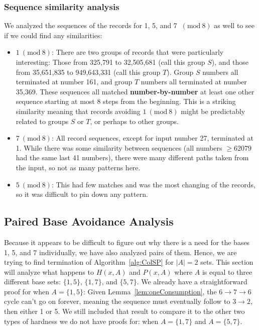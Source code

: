 \documentclass[12pt]{article}
\newcommand{\Mod}[1]{\ (\mathrm{mod}\ #1)}
\theoremstyle{definition}
\begin{document}
\subsubsection{Sequence similarity analysis} \label{subsubsec:algseqsim}
We analyzed the sequences of the records for 1, 5, and 7 $\Mod{8}$ as well to see if we could find any similarities:
\begin{itemize}
    \item $1\Mod{8}$: There are two groups of records that were particularly interesting: Those from 325,791 to 32,505,681 (call this group $S$), and those from 35,651,835 to 949,643,331 (call this group $T$). Group $S$ numbers all terminated at number 161, and group $T$ numbers all terminated at number 35,369. These sequences all matched \textbf{number-by-number} at least one other sequence starting at most 8
    steps from the beginning. This is a striking similarity meaning that records avoiding $1 \Mod{8}$ might be predictably related to groups $S$ or $T$, or perhaps to other groups.
    \item $7 \Mod{8}$: All record sequences, except for input number 27, terminated at 1. While there was some similarity between sequences (all numbers $\geq 62079$ had the same last 41 numbers), there were many different paths taken from the input, so not as many patterns here.
    \item $5 \Mod{8}$: This had few matches and was the most changing of the records, so it was difficult to pin down any pattern.
\end{itemize}
\subsection{Paired Base Avoidance Analysis} \label{subsec:algpairedbase}
Because it appears to be difficult to figure out why there is a need for the bases 1, 5, and 7 individually, we have also analyzed pairs of them. Hence, we are trying to find termination of Algorithm~\ref{alg:ColSP} for $|A| = 2$ sets. This section will analyze what happens to $H(x,A)$ and $P(x,A)$ where $A$ is equal to three different base sets: $\{1,5\}$, $\{1,7\}$, and $\{5,7\}$. We already have a straightforward proof for when $A = \{1, 5\}$: Given Lemma~\ref{lem:oneConsumption}, the $6 \rightarrow 7 \rightarrow 6$ cycle can't go on forever, meaning the sequence must eventually follow to $3 \rightarrow 2$, then either 1 or 5. We still included that result to compare it to the other two types of hardness we do not have proofs for: when $A = \{1,7\}$ and $A = \{5,7\}$.
\end{document}
